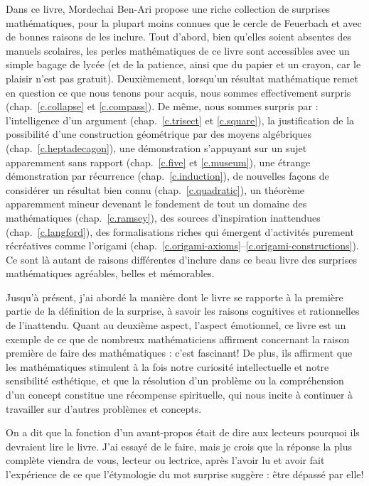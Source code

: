Dans ce livre, Mordechai Ben-Ari propose une riche collection de surprises mathématiques, pour la plupart moins connues que le cercle de Feuerbach et avec de bonnes raisons de les inclure. Tout d'abord, bien qu'elles soient absentes des manuels scolaires, les perles mathématiques de ce livre sont accessibles avec un simple bagage de lycée (et de la patience, ainsi que du papier et un crayon, car le plaisir n'est pas gratuit). Deuxièmement, lorsqu'un résultat mathématique remet en question ce que nous tenons pour acquis, nous sommes effectivement surpris (chap.~\ref{c.collapse} et  \ref{c.compass}). De même, nous sommes surpris par : l'intelligence d'un argument (chap.~\ref{c.trisect} et \ref{c.square}), la justification de la possibilité d'une construction géométrique par des moyens algébriques (chap.~\ref{c.heptadecagon}), une démonstration s'appuyant sur un sujet apparemment sans rapport (chap.~\ref{c.five}  et \ref{c.museum}), une étrange démonstration par récurrence  (chap.~\ref{c.induction}), de nouvelles façons de considérer un résultat bien connu (chap.~\ref{c.quadratic}), un théorème apparemment mineur devenant le fondement de tout un domaine des mathématiques (chap.~\ref{c.ramsey}), des sources d'inspiration inattendues (chap.~\ref{c.langford}), des formalisations riches qui émergent d'activités purement récréatives comme l'origami (chap.~\ref{c.origami-axioms}--\ref{c.origami-constructions}). Ce sont là autant de raisons différentes d'inclure dans ce beau livre des surprises mathématiques agréables, belles et mémorables.
   
Jusqu'à présent, j'ai abordé la manière dont le livre se rapporte à la première partie de la définition de la surprise, à savoir les raisons cognitives et rationnelles de l'inattendu. Quant au deuxième aspect, l'aspect émotionnel, ce livre est un exemple  de ce que de nombreux mathématiciens affirment concernant la raison première de faire des mathématiques : c'est fascinant! De plus, ils affirment que les mathématiques stimulent à la fois notre curiosité intellectuelle et notre sensibilité esthétique, et que la résolution d'un problème ou la compréhension d'un concept constitue une récompense spirituelle, qui nous incite à continuer à travailler sur d'autres problèmes et concepts. 

On a dit que la fonction d'un avant-propos était de dire aux lecteurs pourquoi ils devraient lire le livre. J'ai essayé de le faire, mais je crois que la réponse la plus complète viendra de vous, lecteur ou lectrice, après l'avoir lu et avoir fait l'expérience de ce que l'étymologie du mot \og surprise\fg{} suggère : être dépassé par elle!


